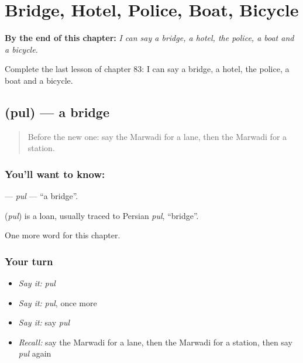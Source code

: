 
\chapter{Bridge, Hotel, Police, Boat, Bicycle}
\label{ch:mw-bridge-hotel-police-boat-bicycle}

\begin{chapteropening}
\textbf{By the end of this chapter:} \emph{I can say a bridge, a hotel, the police, a boat and a bicycle.}

Complete the last lesson of chapter 83: I can say a bridge, a hotel, the police, a boat and a bicycle.
\end{chapteropening}

\section[\texorpdfstring{\mw{पुल} (pul)}{पुल (pul)}]{ (pul) — a bridge}

\label{lesson:MW-C83-pul}



\begin{quote}
Before the new one: say the Marwadi for a lane, then the Marwadi for a station.
\end{quote}

\subsection*{You'll want to know: }
\textbf{} — \emph{pul} — \textquotedblleft{}a bridge\textquotedblright{}.

\begin{cousinweb}
\textbf{} (\emph{pul}) is a loan, usually traced to Persian \emph{pul}, \textquotedblleft{}bridge\textquotedblright{}.
\end{cousinweb}

\begin{grammarlens}[title={What you've built}]
One more word for this chapter.
\end{grammarlens}

\subsection*{Your turn}
\begin{itemize}
\raggedright
  \item \emph{Say it:} \emph{pul}
  \item \emph{Say it:} \emph{pul}, once more
  \item \emph{Say it:} say \emph{pul}
  \item \emph{Recall:} say the Marwadi for a lane, then the Marwadi for a station, then say \emph{pul} again
\end{itemize}

